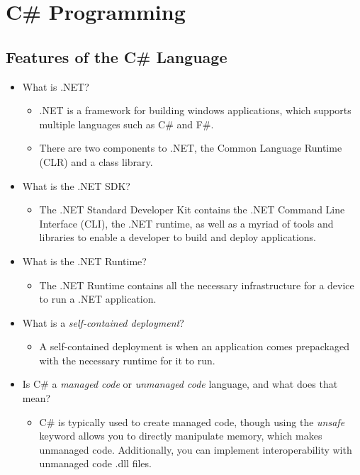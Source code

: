\documentclass{article}
\begin{document}
\newpage
\section{C\# Programming}

\subsection{Features of the C\# Language}
\begin{itemize}
    \item What is .NET?
    \begin{itemize}
        \item .NET is a framework for building windows applications, which supports multiple languages such as C\# and F\#.
        \item There are two components to .NET, the Common Language Runtime (CLR) and a class library.
    \end{itemize}
    \item What is the .NET SDK?
    \begin{itemize}
        \item The .NET Standard Developer Kit contains the .NET Command Line Interface (CLI), the .NET runtime, as well as a myriad of tools and libraries to enable a developer to build and deploy applications. 
    \end{itemize}
    \item What is the .NET Runtime?
    \begin{itemize}
        \item The .NET Runtime contains all the necessary infrastructure for a device to run a .NET application.
    \end{itemize}
        \item What is a \textit{self-contained deployment}?
    \begin{itemize}
        \item A self-contained deployment is when an application comes prepackaged with the necessary runtime for it to run.
    \end{itemize}
    \item Is C\# a \textit{managed code} or \textit{unmanaged code} language, and what does that mean?
    \begin{itemize}
        \item C\# is typically used to create managed code, though using the \textit{unsafe} keyword allows you to directly manipulate memory, which makes unmanaged code. Additionally, you can implement interoperability with unmanaged code .dll files.

\end{itemize}
\end{itemize}
\end{document}
